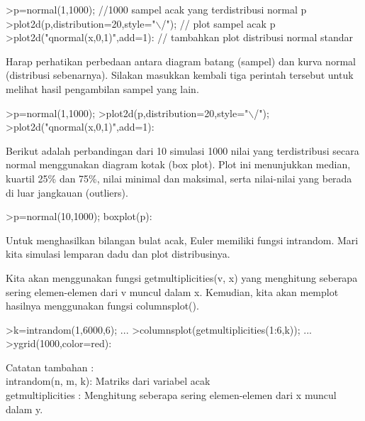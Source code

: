 \documentclass[a4paper,10pt]{article}
\begin{document}
\begin{eulernotebook}
\begin{eulerprompt}
>p=normal(1,1000); //1000 sampel acak yang terdistribusi normal p
>plot2d(p,distribution=20,style="\(\backslash\)/"); // plot sampel acak p
>plot2d("qnormal(x,0,1)",add=1): // tambahkan plot distribusi normal standar
\end{eulerprompt}
\begin{eulercomment}
Harap perhatikan perbedaan antara diagram batang (sampel) dan kurva
normal (distribusi sebenarnya). Silakan masukkan kembali tiga perintah
tersebut untuk melihat hasil pengambilan sampel yang lain.
\end{eulercomment}
\begin{eulerprompt}
>p=normal(1,1000); 
>plot2d(p,distribution=20,style="\(\backslash\)/"); 
>plot2d("qnormal(x,0,1)",add=1): 
\end{eulerprompt}
\begin{eulercomment}
Berikut adalah perbandingan dari 10 simulasi 1000 nilai yang
terdistribusi secara normal menggunakan diagram kotak (box plot). Plot
ini menunjukkan median, kuartil 25\% dan 75\%, nilai minimal dan
maksimal, serta nilai-nilai yang berada di luar jangkauan (outliers).
\end{eulercomment}
\begin{eulerprompt}
>p=normal(10,1000); boxplot(p):
\end{eulerprompt}
\begin{eulercomment}
Untuk menghasilkan bilangan bulat acak, Euler memiliki fungsi
intrandom. Mari kita simulasi lemparan dadu dan plot distribusinya.

Kita akan menggunakan fungsi getmultiplicities(v, x) yang menghitung
seberapa sering elemen-elemen dari v muncul dalam x. Kemudian, kita
akan memplot hasilnya menggunakan fungsi columnsplot().
\end{eulercomment}
\begin{eulerprompt}
>k=intrandom(1,6000,6);  ...
>columnsplot(getmultiplicities(1:6,k));  ...
>ygrid(1000,color=red):
\end{eulerprompt}
\begin{eulercomment}
Catatan tambahan :\\
intrandom(n, m, k): Matriks dari variabel acak\\
getmultiplicities : Menghitung seberapa sering elemen-elemen dari x
muncul dalam y.


\end{eulercomment}
\end{eulernotebook}
\end{document}
